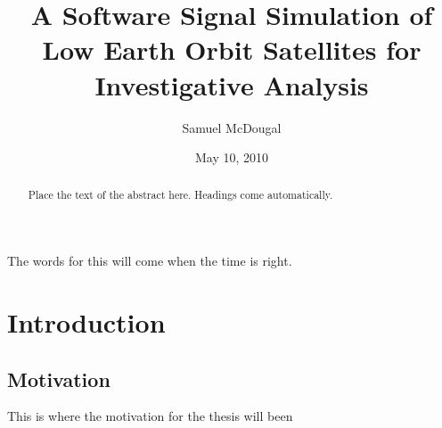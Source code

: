 \documentclass[12pt]{report}
\title{A Software Signal Simulation of Low Earth Orbit Satellites for Investigative Analysis}
\author{Samuel McDougal}
\date{May 10, 2010} %
\begin{document}
\begin{romanpages}      %

\TitlePage 

\begin{abstract} 
Place the text of the abstract here. Headings come automatically.
\end{abstract}

\begin{acknowledgments}
The words for this will come when the time is right.
\end{acknowledgments}

\begin{singlespace}

\begin{center} 
\renewcommand{\cftchapfont}{}
\renewcommand{\cftchappagefont}{}
\renewcommand{\cfttoctitlefont}{\normalsize}%
\renewcommand{\cftsecfont }{\normalsize}%
\renewcommand{\cftsecpagefont}{\normalsize}%
\tableofcontents 
\newpage
\renewcommand{\cftchapfont}{}
\renewcommand{\cftchappagefont}{}
\renewcommand{\cftloftitlefont}{\normalsize}%
\renewcommand{\cftsecfont}{\normalsize}%
\renewcommand{\cftsecpagefont}{\normalsize}%
\listoffigures
\newpage
\renewcommand{\cftchapfont}{}
\renewcommand{\cftchappagefont}{}
\renewcommand{\cftlottitlefont}{\normalsize}%
\renewcommand{\cftsecfont}{\normalsize}%
\renewcommand{\cftsecpagefont}{\normalsize}%
\listoftables
\end{center}
\end{singlespace}

\printnomenclature[0.5in] %
\end{romanpages}        %


\normalem       %

 \chapter { Introduction}  %

\section { \normalfont Motivation}
This is where the motivation for the thesis will been
\end{document}
